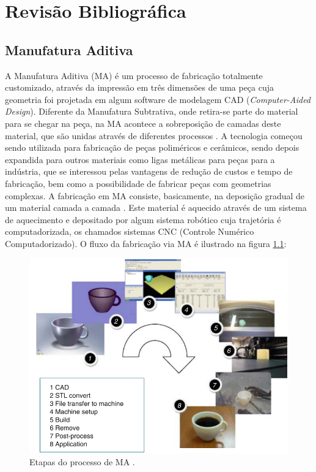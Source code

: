\chapter{Revisão Bibliográfica}
\label{chap2}

\section{Manufatura Aditiva}

A Manufatura Aditiva (MA) é um processo de fabricação totalmente customizado, através da impressão em três dimensões de uma peça cuja geometria foi projetada em algum software de modelagem CAD (\textit{Computer-Aided Design}). Diferente da Manufatura Subtrativa, onde retira-se parte do material para se chegar na peça, na MA acontece a sobreposição de camadas deste material, que são unidas através de diferentes processos \cite{gibson2021additive}. A tecnologia começou sendo utilizada para fabricação de peças poliméricos e cerâmicos, sendo depois expandida para outros materiais como ligas metálicas para peças para a indústria, que se interessou pelas vantagens de redução de custos e tempo de fabricação, bem como a possibilidade de fabricar peças com geometrias complexas. A fabricação em MA consiste, basicamente, na deposição gradual de um material camada a camada \cite{srinivas2017critical}. Este material é aquecido através de um sistema de aquecimento e depositado por algum sistema robótico cuja trajetória é computadorizada, os chamados sistemas CNC (Controle Numérico Computadorizado). O fluxo da fabricação via MA é ilustrado na figura \ref{fig:ma_steps}:
\newpage
\begin{figure}[hbt!]
    \centering
    \includegraphics[width=0.8\linewidth]{Imagens/chap02/ma_steps.png}
    \caption{Etapas do processo de MA \cite{gibson2021additive}.}
    \label{fig:ma_steps}
\end{figure}
